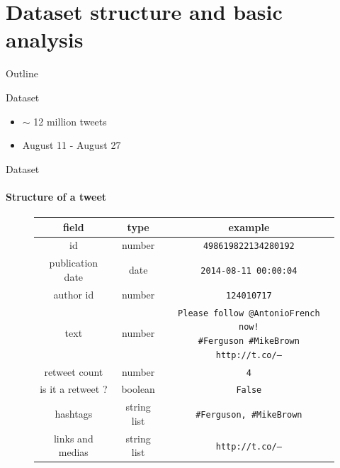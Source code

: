\documentclass[first=dblue,second=red,logo=blueexc]{aaltoslides}
\begin{document}
\section{Dataset structure and basic analysis}
\begin{frame}{Outline}
\tableofcontents[sectionstyle=show/shaded]
\end{frame}


\begin{frame}{Dataset}
\begin{itemize}
\item $\sim$ 12 million tweets
\item August 11 - August 27
\end{itemize}

\end{frame}


\begin{frame}{Dataset}
\framesubtitle{Structure of a tweet}

\begin{figure}[h!]
\centering
\begin{tabular}{ccc}
field & type & example\\
\hline
\hline
id & number & \texttt{498619822134280192} \\ \hline
publication date & date & \texttt{2014-08-11 00:00:04} \\ \hline
author id & number & \texttt{124010717} \\ \hline
text & number & \pbox{5cm}{\vspace*{5pt}\texttt{Please follow @AntonioFrench now! \newline \#Ferguson \#MikeBrown http://t.co/---}\vspace*{5pt}} \\ \hline
retweet count & number & \texttt{4} \\ \hline
is it a retweet ? & boolean & \texttt{False} \\ \hline
hashtags & string list & \texttt{\#Ferguson, \#MikeBrown} \\ \hline
links and medias & string list & \texttt{http://t.co/---} \\ \hline \hline
\end{tabular}
\end{figure}

\end{frame}
\end{document}
